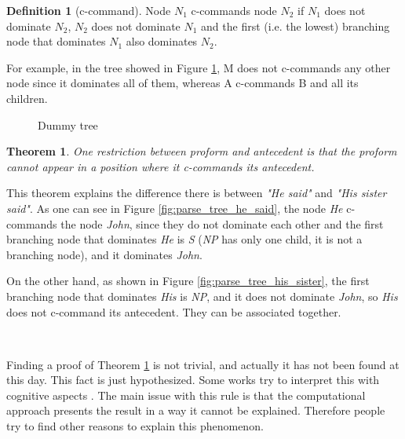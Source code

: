 \documentclass[a4paper]{article}
\newtheorem{theorem}{Theorem}[section]
\theoremstyle{definition}
\newtheorem{definition}{Definition}[section]
\begin{document}
\begin{definition}[c-command]
Node $N_1$ c-commands node $N_2$ if $N_1$ does not dominate $N_2$, $N_2$ does not dominate $N_1$ and the first (i.e. the lowest) branching node that dominates $N_1$ also dominates $N_2$.
\end{definition}

For example, in the tree showed in Figure \ref{fig:dummy_tree}, M does not c-commands any other node since it dominates all of them, whereas A c-commands B and all its children.

\begin{figure}
\centering
{}
\caption{Dummy tree\label{fig:dummy_tree}}
\end{figure}

\begin{theorem}
\label{thm:ccommand}
One restriction between proform and antecedent is that the proform cannot appear in a position where it c-commands its antecedent.
\end{theorem}

This theorem explains the difference there is between \emph{"He said"} and \emph{"His sister said"}. As one can see in Figure \ref{fig:parse_tree_he_said}, the node \emph{He} c-commands the node \emph{John}, since they do not dominate each other and the first branching node that dominates \emph{He} is \emph{S} (\emph{NP} has only one child, it is not a branching node), and it dominates \emph{John}.

On the other hand, as shown in Figure \ref{fig:parse_tree_his_sister}, the first branching node that dominates \emph{His} is \emph{NP}, and it does not dominate \emph{John}, so \emph{His} does not c-command its antecedent. They can be associated together.

~\par

Finding a proof of Theorem \ref{thm:ccommand} is not trivial, and actually it has not been found at this day. This fact is just hypothesized. Some works try to interpret this with cognitive aspects \cite{bouchard2010explication}. The main issue with this rule is that the computational approach presents the result in a way it cannot be explained. Therefore people try to find other reasons to explain this phenomenon.
\end{document}
